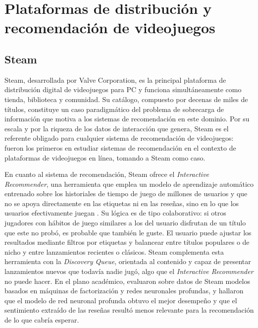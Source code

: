 \section{Plataformas de distribución y recomendación de videojuegos}\label{sec:plataformas_distribucion}

\subsection{Steam}\label{subsec:steam}

Steam, desarrollada por Valve Corporation, es la principal plataforma de distribución digital de videojuegos para PC y funciona simultáneamente como tienda, biblioteca y comunidad. Su catálogo, compuesto por decenas de miles de títulos, constituye un caso paradigmático del problema de sobrecarga de información que motiva a los sistemas de recomendación en este dominio. Por su escala y por la riqueza de los datos de interacción que genera, Steam es el referente obligado para cualquier sistema de recomendación de videojuegos: \textcite{CheuqueEtAl2019} fueron los primeros en estudiar sistemas de recomendación en el contexto de plataformas de videojuegos en línea, tomando a Steam como caso.

En cuanto al sistema de recomendación, Steam ofrece el \emph{Interactive Recommender}, una herramienta que emplea un modelo de aprendizaje automático entrenado sobre los historiales de tiempo de juego de millones de usuarios y que no se apoya directamente en las etiquetas ni en las reseñas, sino en lo que los usuarios efectivamente juegan \parencite{ValveCorporation2020}. Su lógica es de tipo colaborativo: si otros jugadores con hábitos de juego similares a los del usuario disfrutan de un título que este no probó, es probable que también le guste. El usuario puede ajustar los resultados mediante filtros por etiquetas y balancear entre títulos populares o de nicho y entre lanzamientos recientes o clásicos. Steam complementa esta herramienta con la \emph{Discovery Queue}, orientada al contenido y capaz de presentar lanzamientos nuevos que todavía nadie jugó, algo que el \emph{Interactive Recommender} no puede hacer. En el plano académico, \textcite{CheuqueEtAl2019} evaluaron sobre datos de Steam modelos basados en máquinas de factorización y redes neuronales profundas, y hallaron que el modelo de red neuronal profunda obtuvo el mejor desempeño y que el sentimiento extraído de las reseñas resultó menos relevante para la recomendación de lo que cabría esperar.

